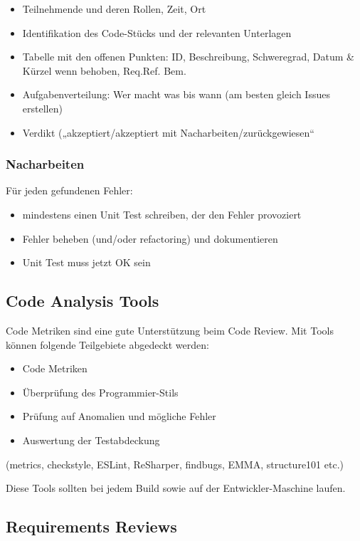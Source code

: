 \begin{itemize}
	\item Teilnehmende und deren Rollen, Zeit, Ort
	\item Identifikation des Code-Stücks und der relevanten Unterlagen
	\item Tabelle mit den offenen Punkten: ID, Beschreibung, Schweregrad, Datum \& Kürzel wenn behoben, Req.Ref. Bem.
	\item Aufgabenverteilung: Wer macht was bis wann (am besten gleich Issues erstellen)
	\item Verdikt („akzeptiert/akzeptiert mit Nacharbeiten/zurückgewiesen“
\end{itemize}

\subsubsection{Nacharbeiten}

Für jeden gefundenen Fehler:
\begin{itemize}
	\item mindestens einen Unit Test schreiben, der den Fehler provoziert
	\item Fehler beheben (und/oder refactoring) und dokumentieren
	\item Unit Test muss jetzt OK sein
\end{itemize}

\subsection{Code Analysis Tools}\label{sec:code-analysis-tools}

Code Metriken sind eine gute Unterstützung beim Code Review. Mit Tools können folgende Teilgebiete abgedeckt werden:
\begin{itemize}
	\item Code Metriken
	\item Überprüfung des Programmier-Stils
	\item Prüfung auf Anomalien und mögliche Fehler
	\item Auswertung der Testabdeckung
\end{itemize}

(metrics, checkstyle, ESLint, ReSharper, findbugs, EMMA, structure101 etc.)

Diese Tools sollten bei jedem Build sowie auf der Entwickler-Maschine laufen.

\subsection{Requirements Reviews}

